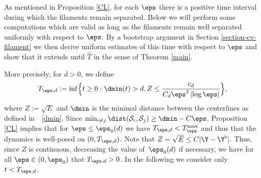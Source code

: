 As mentioned in Proposition \ref{CL}, for each $\eps$ there is a positive time interval during which the filaments remain separated.
Below we will perform some computations
which are valid as long as the filaments remain well separated uniformly with respect to $\eps$. By a bootstrap argument in Section \ref{section-cv-filament} we then derive uniform estimates of this time with respect to $\eps$ and show that it extends until $\hat T$ in the sense of Theorem \ref{main}.

More precisely, for $d > 0$, we define
\begin{equation}\label{def.Tepsd}
T_{\eps,d} := \inf \Bigl\{ t \geq 0 : \dmin(t) > d, Z \leq \frac {c_d}{C_d \eps^2 \left|\log \eps\right|} \Bigr\},
\end{equation}
where $Z:=\sqrt E$ and $\dmin$ is the minimal distance between the centerlines as defined in~ \eqref{dmin}.
Since $\min_{i \neq j} \dist(\mathcal S_i,\mathcal S_j) \geq \dmin - C \eps$, Proposition \ref{CL}
implies that for \hbox{$\eps \leq \eps_0(d)$} we have $T_{\eps,d} < T_\eps^{\max}$ and thus that the dynamics is well-posed on $(0,T_{\eps,d})$.
Note that $Z = \sqrt E \leq C | \Y - \Y^\flat |$.
Thus, since $Z$ is continuous, decreasing the value of~$\eps_0(d)$ if necessary, we have for all $\eps\in(0,\eps_0)$ that $T_{\eps,d} > 0$.
In the following we consider only $t < T_{\eps,d}$.


